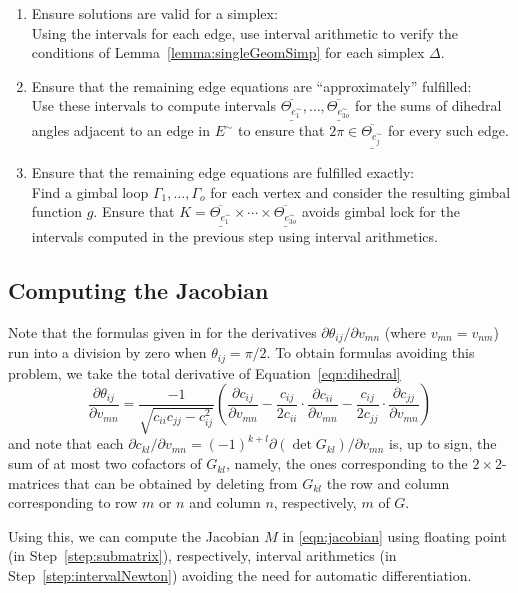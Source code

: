 \documentclass[utopia,fullpage]{nmd/article}
\newcommand\du[1]{\underline{\overline{#1}}}
\newcommand\myPath{\Gamma}
\begin{document}
\begin{enumerate}
\item \label{step:validGram} Ensure solutions are valid for a simplex:\\
Using the intervals for each edge, use interval arithmetic to verify the conditions of Lemma~\ref{lemma:singleGeomSimp} for each simplex $\Delta$.
\item \label{step:approxEdgeEqn} Ensure that the remaining edge equations are ``approximately'' fulfilled:\\
Use these intervals to compute intervals $\du{\Theta_{e^\sim_1}},\dots,\du{\Theta_{e^\sim_{3o}}}$ for the sums of dihedral angles adjacent to an edge in $E^\sim$ to ensure that $2\pi \in \du{\Theta_{e^\sim_j}}$ for every such edge.
\item \label{step:avoidGimbal} Ensure that the remaining edge equations are fulfilled exactly:\\
Find a gimbal loop $\myPath_1,\dots,\myPath_o$ for each vertex and consider the resulting gimbal function $g$. Ensure that $K=\du{\Theta_{e^\sim_1}}\times\cdots\times\du{\Theta_{e^\sim_{3o}}}$ avoids gimbal lock for the intervals computed in the previous step using interval arithmetics.
\end{enumerate}

\subsection{Computing the Jacobian}

Note that the formulas given in \cite[Lemma~2.5]{heardThesis} for the derivatives $\partial\theta_{ij}/\partial{v_{mn}}$ (where $v_{mn}=v_{nm}$) run into a division by zero when $\theta_{ij}=\pi/2$. To obtain formulas avoiding this problem, we take the total derivative of Equation~\ref{eqn:dihedral}
$$\frac{\partial\theta_{ij}}{\partial{v_{mn}}}
=\frac{-1}{\sqrt{c_{ii}c_{jj}-c_{ij}^2}} \left(\frac{\partial c_{ij}}{\partial v_{mn}} - \frac{c_{ij}}{2 c_{ii}}\cdot \frac{\partial c_{ii}}{\partial v_{mn}} - \frac{c_{ij}}{2c_{jj}}\cdot \frac{\partial c_{jj}}{\partial v_{mn}}\right)
 $$ and note that each $\partial c_{kl}/\partial v_{mn}=(-1)^{k+l} \partial (\det G_{kl}) / \partial v_{mn}$ is, up to sign, the sum of at most two cofactors of $G_{kl}$, namely, the ones corresponding to the $2\times 2$-matrices that can be obtained by deleting from $G_{kl}$ the row and column corresponding to row $m$ or $n$ and column $n$, respectively, $m$ of $G$.

Using this, we can compute the Jacobian $M$ in \eqref{eqn:jacobian} using floating point (in Step~\ref{step:submatrix}), respectively, interval arithmetics (in Step~\ref{step:intervalNewton}) avoiding the need for automatic differentiation.
\end{document}
